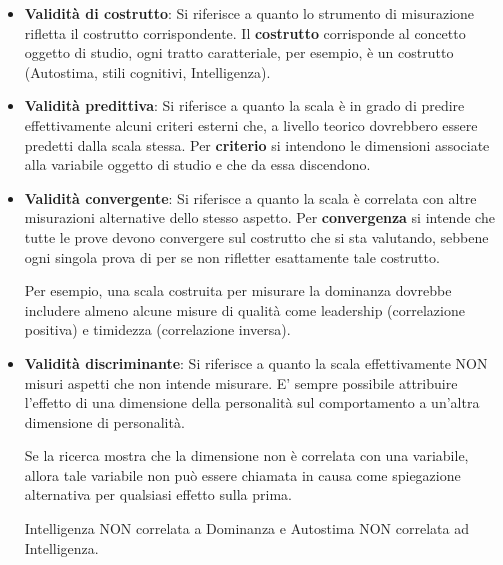 \documentclass{subfiles}
\begin{document}
        \begin{itemize}
            \item \textbf{Validità di costrutto}: Si riferisce a quanto lo strumento di misurazione 
            rifletta il costrutto corrispondente. 
            Il \textbf{costrutto} corrisponde al concetto oggetto di studio, ogni tratto 
            caratteriale, per esempio, è un costrutto (Autostima, stili cognitivi, Intelligenza).

            \item \textbf{Validità predittiva}: Si riferisce a quanto la scala è in grado di 
            predire effettivamente alcuni criteri esterni che, a livello teorico dovrebbero 
            essere predetti dalla scala stessa. 
            Per \textbf{criterio} si intendono le dimensioni associate alla variabile oggetto 
            di studio e che da essa discendono. 

            \item \textbf{Validità convergente}: Si riferisce a quanto la scala è correlata 
            con altre misurazioni alternative dello stesso aspetto. Per \textbf{convergenza} 
            si intende che tutte le prove devono convergere sul costrutto che si sta valutando, 
            sebbene ogni singola prova di per se non rifletter esattamente tale costrutto. 
            
            Per esempio, una scala costruita per misurare la dominanza dovrebbe includere almeno 
            alcune misure di qualità come leadership (correlazione positiva) e timidezza (correlazione inversa).
            
            \item \textbf{Validità discriminante}: Si riferisce a quanto la scala effettivamente 
            NON misuri aspetti che non intende misurare. 
            E' sempre possibile attribuire l'effetto di una dimensione della personalità sul 
            comportamento a un'altra dimensione di personalità. 

            Se la ricerca mostra che la dimensione non è correlata con una variabile, allora tale 
            variabile non può essere chiamata in causa come spiegazione alternativa per qualsiasi 
            effetto sulla prima. 

            Intelligenza NON correlata a Dominanza e Autostima NON correlata ad Intelligenza.
        \end{itemize}

        \clearpage

        

   
\end{document}
